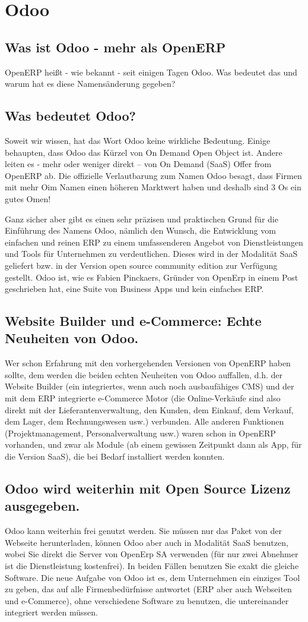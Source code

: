 \section{Odoo}
\subsection{Was ist Odoo - mehr als OpenERP}
OpenERP heißt - wie bekannt - seit einigen Tagen Odoo. Was bedeutet das und warum hat es diese Namensänderung gegeben?
\subsection{Was bedeutet Odoo?}
Soweit wir wissen, hat das Wort Odoo keine wirkliche Bedeutung. Einige behaupten, dass Odoo das Kürzel von On Demand Open Object ist. Andere leiten es - mehr oder weniger direkt – von On Demand (SaaS) Offer from OpenERP ab. Die offizielle Verlautbarung zum Namen Odoo besagt, dass Firmen mit mehr \glqq O\grqq \space im Namen einen höheren Marktwert haben und deshalb sind 3 Os ein gutes Omen!

Ganz sicher aber gibt es einen sehr präzisen und praktischen Grund für die Einführung des Namens Odoo, nämlich den Wunsch, die Entwicklung vom einfachen und reinen ERP zu einem umfassenderen Angebot von Dienstleistungen und Tools für Unternehmen zu verdeutlichen. Dieses wird in der Modalität SaaS geliefert bzw. in der Version open source community edition zur Verfügung gestellt. Odoo ist, wie es Fabien Pinckaers, Gründer von OpenErp in einem Post geschrieben hat, eine Suite von Business Apps und kein einfaches ERP.
\subsection{Website Builder und e-Commerce: Echte Neuheiten von Odoo.}
Wer schon Erfahrung mit den vorhergehenden Versionen von OpenERP haben sollte, dem werden die beiden echten Neuheiten von Odoo auffallen, d.h. der Website Builder (ein integriertes, wenn auch noch ausbaufähiges CMS) und der mit dem ERP integrierte e-Commerce Motor (die Online-Verkäufe sind also direkt mit der Lieferantenverwaltung, den Kunden, dem Einkauf, dem Verkauf, dem Lager, dem Rechnungswesen usw.) verbunden. Alle anderen Funktionen (Projektmanagement, Personalverwaltung usw.) waren schon in OpenERP vorhanden, und zwar als Module (ab einem gewissen Zeitpunkt dann als App, für die Version SaaS), die bei Bedarf installiert werden konnten.
\subsection{Odoo wird weiterhin mit Open Source Lizenz ausgegeben.}
Odoo kann weiterhin frei genutzt werden. Sie müssen nur das Paket von der Webseite herunterladen, können Odoo aber auch in Modalität SaaS benutzen, wobei Sie direkt die Server von OpenErp SA verwenden (für nur zwei Abnehmer ist die Dienstleistung kostenfrei). In beiden Fällen benutzen Sie exakt die gleiche Software. Die neue Aufgabe von Odoo ist es, dem Unternehmen ein einziges Tool zu geben, das auf alle Firmenbedürfnisse 
antwortet (ERP aber auch Webseiten und e-Commerce), ohne verschiedene Software zu benutzen, die untereinander integriert werden müssen.

